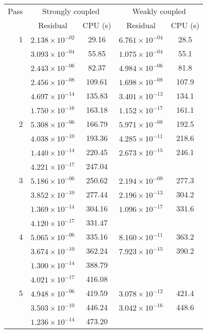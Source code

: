\begin{table}
\begin{center}
\begin{tabular}{|r|c|c|c|c|}
\hline
Pass & \multicolumn{2}{c|}{Strongly coupled} &
       \multicolumn{2}{c|}{Weakly coupled}\\
\cline{2-5} & Residual & CPU (s) & Residual & CPU (s)\\
\hline\hline 1
&$ 2.138\times10^{-02}$&  29.16 &$6.761\times10^{-04}$&   28.5 \\
&$ 3.093\times10^{-04}$&  55.85 &$1.075\times10^{-04}$&   55.1 \\
&$ 2.443\times10^{-06}$&  82.37 &$4.984\times10^{-06}$&   81.8 \\
&$ 2.456\times10^{-08}$& 109.61 &$1.698\times10^{-08}$&  107.9 \\
&$ 4.697\times10^{-14}$& 135.83 &$3.401\times10^{-13}$&  134.1 \\
&$ 1.750\times10^{-16}$& 163.18 &$1.152\times10^{-17}$&  161.1 \\
\hline 2
&$ 5.308\times10^{-06}$& 166.79  &$5.971\times10^{-08}$& 192.5 \\
&$ 4.038\times10^{-10}$& 193.36  &$4.285\times10^{-11}$& 218.6 \\
&$ 1.440\times10^{-14}$& 220.45  &$2.673\times10^{-15}$& 246.1 \\
&$ 4.221\times10^{-17}$& 247.04  &$                   $&      \\
\hline 3
&$5.186\times10^{-06}$& 250.62  &$2.194\times10^{-09}$& 277.3 \\
&$3.852\times10^{-10}$& 277.44  &$2.196\times10^{-13}$& 304.2 \\
&$1.369\times10^{-14}$& 304.16  &$1.096\times10^{-17}$& 331.6 \\
&$4.120\times10^{-17}$& 331.47  &$                   $&       \\
\hline 4
&$5.065\times10^{-06}$& 335.16  &$8.160\times10^{-11}$& 363.2 \\ 
&$3.674\times10^{-10}$& 362.24  &$7.923\times10^{-15}$& 390.2 \\
&$1.300\times10^{-14}$& 388.79  &$                   $&       \\
&$4.021\times10^{-17}$& 416.08  &$                   $&       \\
\hline 5
&$4.948\times10^{-06}$& 419.59  &$3.078\times10^{-12}$& 421.4 \\
&$3.503\times10^{-10}$& 446.24  &$3.042\times10^{-16}$& 448.6 \\
&$1.236\times10^{-14}$& 473.20  &$                   $&       \\

\end{tabular}
\end{center}
\end{table}
